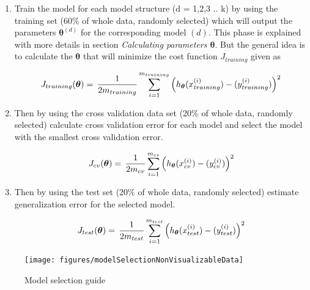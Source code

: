 \begin{enumerate}
  \item Train the model for each model structure (d = 1,2,3 .. k) by using the training set (60\% of whole data, randomly selected) which will output the parameters ${\bm{\theta}}^{(d)}$ for the corresponding model $(d)$.
  This phase is explained with more details in section \emph{Calculating parameters ${\bm{\theta}}$}. But the general idea is to calculate the ${\bm{\theta}}$ that will minimize the cost function $J_{training}$ given as

\begin{equation}{\label{eqn:costFuncTraining}}
J_{training}({\bm{\theta}})
=\,
\frac{1}{2m_{training}} \sum\limits_{i=1}^{m_{training}} \Big(h_{\bm{\theta}}(x_{training}^{(i)}) - (y_{training}^{(i)})\Big)^2  
\end{equation}   
  
  \item Then by using the cross validation data set (20\% of whole data, randomly selected) calculate cross validation error for each model and select the model with the smallest cross validation error.

\begin{equation}{\label{eqn:costFuncCrossVal}}
J_{cv}({\bm{\theta}})
=\,
\frac{1}{2m_{cv}} \sum\limits_{i=1}^{m_{cv}} \Big(h_{\bm{\theta}}(x_{cv}^{(i)}) - (y_{cv}^{(i)})\Big)^2  
\end{equation} 

  \item Then by using the test set (20\% of whole data, randomly selected) estimate generalization error for the selected model.
  
\begin{equation}{\label{eqn:costFuncTest}}
J_{test}({\bm{\theta}})
=\,
\frac{1}{2m_{test}} \sum\limits_{i=1}^{m_{test}} \Big(h_{\bm{\theta}}(x_{test}^{(i)}) - (y_{test}^{(i)})\Big)^2  
\end{equation} 

\end{enumerate}

\begin{landscape}
\begin{figure}
\begin{center}
\texttt{[image: figures/modelSelectionNonVisualizableData]}    %
\caption{Model selection guide} 
\label{fig:modelSelection}
\end{center}
\end{figure}
\end{landscape}
 

